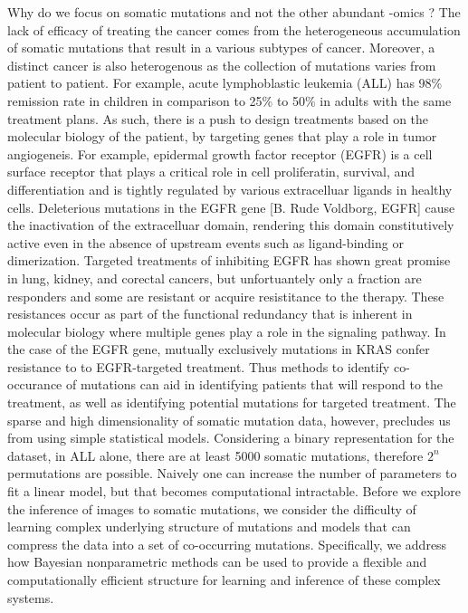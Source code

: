 Why do we focus on somatic mutations and not the other abundant -omics ?  The lack of efficacy of treating the cancer comes from the heterogeneous accumulation of somatic mutations that result in a various subtypes of cancer.  Moreover, a distinct cancer is also heterogenous as the collection of mutations varies from patient to patient. For example, acute lymphoblastic leukemia (ALL) has 98\% remission rate in children in comparison to 25\% to 50\% in adults with the same treatment plans.  As such, there is a push to design treatments based on the molecular biology of the patient, by targeting genes that play a role in tumor angiogeneis.  For example, epidermal growth factor receptor (EGFR) is a cell surface receptor that plays a critical role in cell proliferatin, survival, and differentiation and is tightly regulated by various extracelluar ligands in healthy cells.  Deleterious mutations in the EGFR gene [B. Rude Voldborg, EGFR] cause the inactivation of the extracelluar domain, rendering this domain constitutively active even in the absence of upstream events such as ligand-binding or dimerization.  Targeted treatments of inhibiting EGFR has shown great promise in lung, kidney, and corectal cancers, but unfortuantely only a fraction are responders and some are resistant or acquire resistitance to the therapy.  These resistances occur as part of the functional redundancy that is inherent in molecular biology where multiple genes play a role in the signaling pathway.  In the case of the EGFR gene, mutually exclusively mutations in KRAS confer resistance to to EGFR-targeted treatment.  Thus methods to identify co-occurance of mutations can aid in identifying patients that will respond to the treatment, as well as identifying potential mutations for targeted treatment.  The sparse and high dimensionality of somatic mutation data, however, precludes us from using simple statistical models.  Considering a binary representation for the dataset, in ALL alone, there are at least 5000 somatic mutations, therefore $2^{n}$ permutations are possible.  Naively one can increase the number of parameters to fit a linear model, but that becomes computational intractable.  Before we explore the inference of images to somatic mutations, we consider the difficulty of learning complex underlying structure of mutations and models that can compress the data into a set of co-occurring mutations.  Speciﬁcally, we address how Bayesian nonparametric methods can be used to provide a ﬂexible and computationally eﬃcient structure for learning and inference of these complex systems.  




